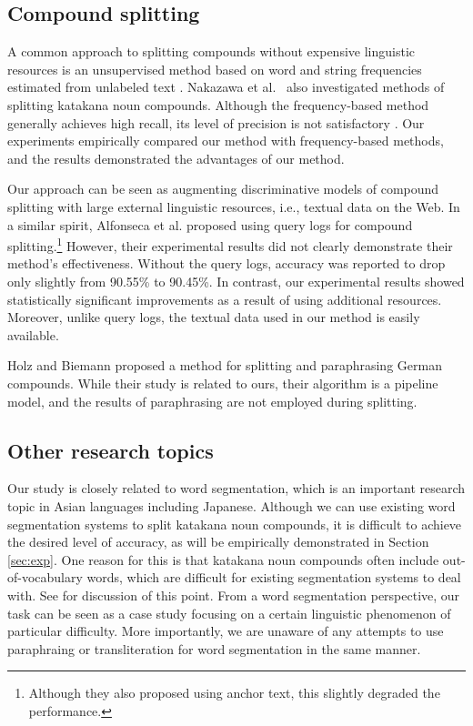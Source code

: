 \documentclass[english]{jnlp_1.4_rep}
\begin{document}
\subsection{Compound splitting}
\label{sec:prev_comp}

A common approach to splitting compounds without expensive linguistic
resources is an unsupervised method based on word and string frequencies
estimated from unlabeled text
\cite{Koehn03,Ando03,Schiller05,Nakazawa05,Holz08}. Nakazawa et
al.\ \citeyear{Nakazawa05} also investigated methods of splitting katakana
noun compounds. Although the frequency-based method generally achieves
high recall, its level of precision is not satisfactory
\cite{Koehn03,Nakazawa05}. Our experiments empirically compared our
method with frequency-based methods, and the results demonstrated the
advantages of our method.

Our approach can be seen as augmenting discriminative models of compound
splitting with large external linguistic resources, i.e., textual data
on the Web. In a similar spirit, Alfonseca et al.\@
{} proposed using query logs for compound
splitting.\footnote{Although they also proposed using anchor text, this slightly
degraded the performance.} 
However, their experimental results did not clearly demonstrate their
method's effectiveness. Without the query logs, accuracy was reported
to drop only slightly from 90.55\% to 90.45\%. In contrast, our
experimental results showed statistically significant improvements as a
result of using additional resources. Moreover, unlike query logs, the
textual data used in our method is easily available.

Holz and Biemann \citeyear{Holz08} proposed a method for splitting and
paraphrasing German compounds. While their study is related to ours,
their algorithm is a pipeline model, and the results of paraphrasing are
not employed during splitting.


\subsection{Other research topics}

Our study is closely related to word segmentation, which is an important
research topic in Asian languages including Japanese. Although we can
use existing word segmentation systems to split katakana noun compounds,
it is difficult to achieve the desired level of accuracy, as will be
empirically demonstrated in Section \ref{sec:exp}. One reason for this
is that katakana noun compounds often include out-of-vocabulary words,
which are difficult for existing segmentation systems to deal
with. See \cite{Nakazawa05} for discussion of this point. From a word
segmentation perspective, our task can be seen as a case study focusing
on a certain linguistic phenomenon of particular difficulty. More
importantly, we are unaware of any attempts to use paraphraing or
transliteration for word segmentation in the same manner.
\end{document}
